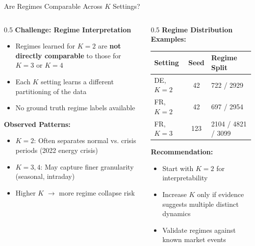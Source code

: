 \documentclass[aspectratio=169]{beamer}
\begin{document}
\begin{frame}{Are Regimes Comparable Across $K$ Settings?}
\begin{columns}
\begin{column}{0.5\textwidth}
\textbf{Challenge: Regime Interpretation}
\begin{itemize}
    \item Regimes learned for $K=2$ are \textbf{not directly comparable} to those for $K=3$ or $K=4$
    \item Each $K$ setting learns a different partitioning of the data
    \item No ground truth regime labels available
\end{itemize}

\vspace{0.3cm}
\textbf{Observed Patterns:}
\begin{itemize}
    \item \textbf{$K=2$}: Often separates normal vs. crisis periods (2022 energy crisis)
    \item \textbf{$K=3,4$}: May capture finer granularity (seasonal, intraday)
    \item Higher $K$ $\rightarrow$ more regime collapse risk
\end{itemize}
\end{column}

\begin{column}{0.5\textwidth}
\textbf{Regime Distribution Examples:}
\begin{table}
\scriptsize
\begin{tabular}{l|c|l}
\toprule
\textbf{Setting} & \textbf{Seed} & \textbf{Regime Split} \\
\midrule
DE, $K=2$ & 42 & 722 / 2929 \\
FR, $K=2$ & 42 & 697 / 2954 \\
FR, $K=3$ & 123 & 2104 / 4821 / 3099 \\
\bottomrule
\end{tabular}
\end{table}

\vspace{0.2cm}
\textbf{Recommendation:}
\begin{itemize}
    \item Start with $K=2$ for interpretability
    \item Increase $K$ only if evidence suggests multiple distinct dynamics
    \item Validate regimes against known market events
\end{itemize}
\end{column}
\end{columns}
\end{frame}
\end{document}
